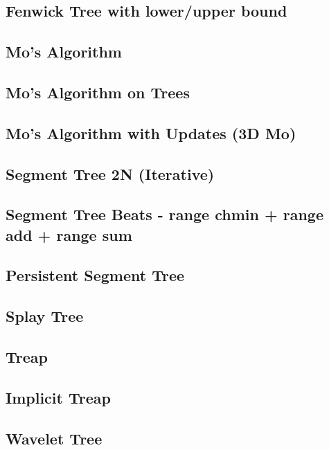 \subsection{Fenwick Tree with lower/upper bound}

\subsection{Mo's Algorithm}

\subsection{Mo's Algorithm on Trees}

\subsection{Mo's Algorithm with Updates (3D Mo)}

\subsection{Segment Tree 2N (Iterative)}

\subsection{Segment Tree Beats - range chmin + range add + range sum}

\subsection{Persistent Segment Tree}

\subsection{Splay Tree}

\subsection{Treap}

\subsection{Implicit Treap}

\subsection{Wavelet Tree}

